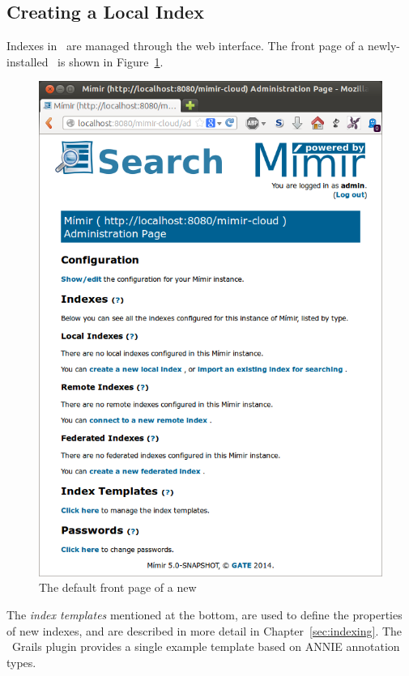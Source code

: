 \subsection{Creating a Local Index}

Indexes in \Mimir\ are managed through the web interface.  The front page of a
newly-installed \Mimir\ is shown in Figure~\ref{fig:front-page}.
%
\begin{figure}[htb!]
\begin{center}
\includegraphics[scale=0.5]{img/default-front-page}
\end{center}
\caption{The default front page of a new \Mimir}
\label{fig:front-page}
\end{figure}
%
The {\em index templates} mentioned at the bottom, are used to define the
properties of new indexes, and are described in more detail in
Chapter~\ref{sec:indexing}.  The \Mimir\ Grails plugin provides a single
example template based on ANNIE annotation types.


